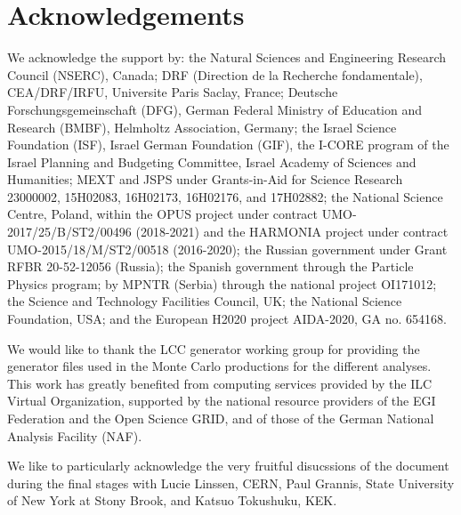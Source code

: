 \chapter*{Acknowledgements}
We acknowledge the support by: 
the Natural Sciences and Engineering Research Council (NSERC), Canada; 
DRF (Direction de la Recherche fondamentale), CEA/DRF/IRFU, Universite Paris Saclay, France; Deutsche Forschungsgemeinschaft (DFG), German Federal Ministry of Education and Research (BMBF), Helmholtz Association, Germany; the Israel Science Foundation (ISF), Israel German Foundation (GIF), the I-CORE program of the Israel Planning and Budgeting Committee, Israel Academy of Sciences and Humanities; 
MEXT and JSPS under Grants-in-Aid for Science Research 23000002, 15H02083, 16H02173, 16H02176, and 17H02882; 
the National Science Centre, Poland, within the OPUS project 
under contract UMO-2017/25/B/ST2/00496 (2018-2021) and the HARMONIA 
project under contract UMO-2015/18/M/ST2/00518 (2016-2020);
the Russian government under Grant RFBR 20-52-12056 (Russia);
the Spanish government through the Particle Physics program; by MPNTR (Serbia) through the national project OI171012; the Science and Technology Facilities Council, UK; the National Science Foundation, USA;
and the European H2020 project AIDA-2020, GA no. 654168.

We would like to thank the LCC generator working group for providing the generator files used in the Monte Carlo productions for the different analyses. This work has greatly benefited
from computing services provided by the ILC Virtual Organization, supported by the national resource
providers of the EGI Federation and the Open Science GRID, and of those of the German National
Analysis Facility (NAF).

We like to particularly acknowledge the very fruitful disucssions of the document during the final stages with Lucie Linssen, CERN, Paul Grannis, State University of New York at Stony Brook, and Katsuo Tokushuku, KEK. 




%

